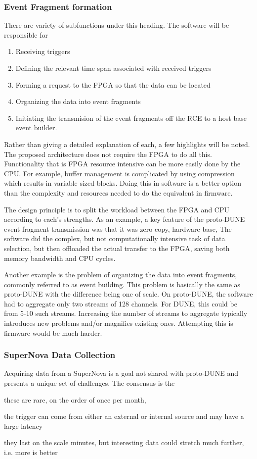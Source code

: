 \subsubsection{Event Fragment formation}
There are variety of subfunctions under this heading.  The software will be responsible for
\begin{enumerate}
    \item Receiving triggers
    \item Defining the relevant time span associated with received triggers
    \item Forming a request to the FPGA so that the data can be located
    \item Organizing the data into event fragments
    \item Initiating the transmision of the event fragments off the RCE to a host base event builder.
\end{enumerate}

Rather than giving a detailed explanation of each, a few highlights will be noted.  The proposed architecture does not require the FPGA to do all this. Functionality that is FPGA resource intensive can be more easily done by the CPU. For example, buffer management is complicated by using compression which results in variable sized blocks.  Doing this in software is a better option than the complexity and resources needed to do the equivalent in firmware.

The design principle is to split the workload between the FPGA and CPU according to each's strengths.  As an example, a key feature of the proto-DUNE event fragment transmission was that it was zero-copy, hardware base, The software did the complex, but not computationally intensive task of data selection, but then offloaded the actual transfer to the FPGA, saving both memory bandwidth and CPU cycles.

Another example is the problem of organizing the data into event fragments, commonly referred to as event building. This problem is basically the same as proto-DUNE with the difference being one of scale. On proto-DUNE, the software had to aggregate only two streams of 128 channels.  For DUNE, this could be from 5-10 such streams. Increasing the number of streams to aggregate typically introduces new problems and/or magnifies existing ones.  Attempting this is firmware would be much harder.

\subsubsection{SuperNova Data Collection}
Acquiring data from a SuperNova is a goal not shared with proto-DUNE and presents a unique set of challenges.  The consensus is the 
\begin{enumeration}
   \item these are rare, on the order of once per month, 
   \item the trigger can come from either an external or internal source and may have a large latency
   \item they last on the scale minutes, but interesting data could stretch much further, i.e. more is better
\end{enumeration}

